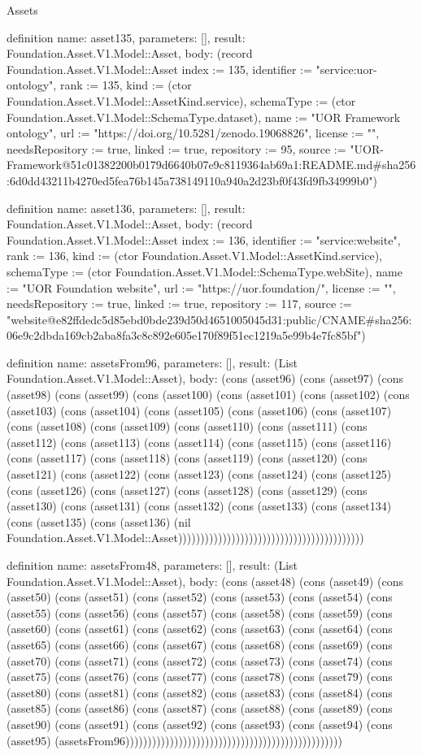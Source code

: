 \begin{lexlean}{Assets}
\begin{semanticmodule}
definition{
  name: asset135,
  parameters: [],
  result: Foundation.Asset.V1.Model::Asset,
  body: (record Foundation.Asset.V1.Model::Asset {index := 135, identifier := "service:uor-ontology", rank := 135, kind := (ctor Foundation.Asset.V1.Model::AssetKind.service), schemaType := (ctor Foundation.Asset.V1.Model::SchemaType.dataset), name := "UOR Framework ontology", url := "https://doi.org/10.5281/zenodo.19068826", license := "", needsRepository := true, linked := true, repository := 95, source := "UOR-Framework@51c01382200b0179d6640b07e9c8119364ab69a1:README.md#sha256:6d0dd43211b4270ed5fea76b145a738149110a940a2d23bf0f43fd9fb34999b0"})
}

definition{
  name: asset136,
  parameters: [],
  result: Foundation.Asset.V1.Model::Asset,
  body: (record Foundation.Asset.V1.Model::Asset {index := 136, identifier := "service:website", rank := 136, kind := (ctor Foundation.Asset.V1.Model::AssetKind.service), schemaType := (ctor Foundation.Asset.V1.Model::SchemaType.webSite), name := "UOR Foundation website", url := "https://uor.foundation/", license := "", needsRepository := true, linked := true, repository := 117, source := "website@e82ffdedc5d85ebd0bde239d50d4651005045d31:public/CNAME#sha256:06e9c2dbda169cb2aba8fa3c8c892e605e170f89f51ec1219a5e99b4e7fc85bf"})
}

definition{
  name: assetsFrom96,
  parameters: [],
  result: (List Foundation.Asset.V1.Model::Asset),
  body: (cons (asset96) (cons (asset97) (cons (asset98) (cons (asset99) (cons (asset100) (cons (asset101) (cons (asset102) (cons (asset103) (cons (asset104) (cons (asset105) (cons (asset106) (cons (asset107) (cons (asset108) (cons (asset109) (cons (asset110) (cons (asset111) (cons (asset112) (cons (asset113) (cons (asset114) (cons (asset115) (cons (asset116) (cons (asset117) (cons (asset118) (cons (asset119) (cons (asset120) (cons (asset121) (cons (asset122) (cons (asset123) (cons (asset124) (cons (asset125) (cons (asset126) (cons (asset127) (cons (asset128) (cons (asset129) (cons (asset130) (cons (asset131) (cons (asset132) (cons (asset133) (cons (asset134) (cons (asset135) (cons (asset136) (nil Foundation.Asset.V1.Model::Asset))))))))))))))))))))))))))))))))))))))))))
}

definition{
  name: assetsFrom48,
  parameters: [],
  result: (List Foundation.Asset.V1.Model::Asset),
  body: (cons (asset48) (cons (asset49) (cons (asset50) (cons (asset51) (cons (asset52) (cons (asset53) (cons (asset54) (cons (asset55) (cons (asset56) (cons (asset57) (cons (asset58) (cons (asset59) (cons (asset60) (cons (asset61) (cons (asset62) (cons (asset63) (cons (asset64) (cons (asset65) (cons (asset66) (cons (asset67) (cons (asset68) (cons (asset69) (cons (asset70) (cons (asset71) (cons (asset72) (cons (asset73) (cons (asset74) (cons (asset75) (cons (asset76) (cons (asset77) (cons (asset78) (cons (asset79) (cons (asset80) (cons (asset81) (cons (asset82) (cons (asset83) (cons (asset84) (cons (asset85) (cons (asset86) (cons (asset87) (cons (asset88) (cons (asset89) (cons (asset90) (cons (asset91) (cons (asset92) (cons (asset93) (cons (asset94) (cons (asset95) (assetsFrom96)))))))))))))))))))))))))))))))))))))))))))))))))
}


\end{semanticmodule}
\end{lexlean}
